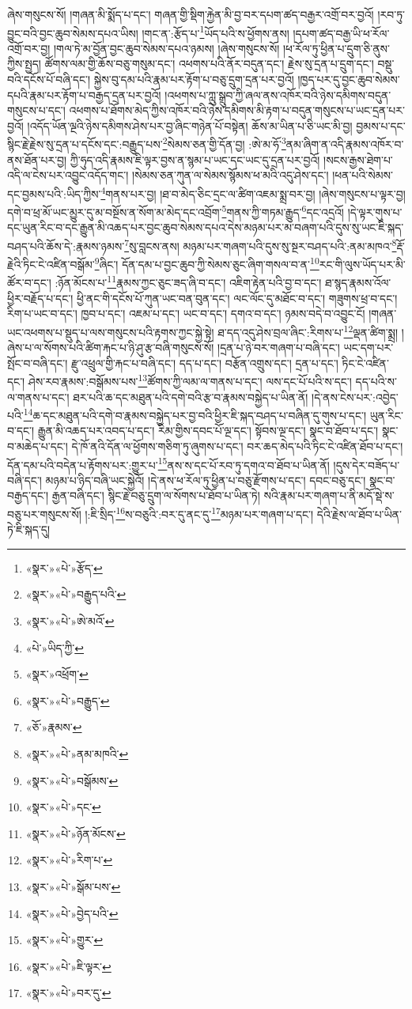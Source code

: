 ཞེས་གསུངས་སོ། །གཞན་མི་སྨོད་པ་དང་། གཞན་གྱི་སྡིག་རྐྱེན་མི་བྱ་བར་དཔག་ཚད་བརྒྱར་འགྲོ་བར་བྱའོ། །རབ་ཏུ་བྱུང་བའི་བྱང་ཆུབ་སེམས་དཔའ་ཡིས། །གང་ན་:རྩོད་པ་\footnote{«སྣར་»«པེ་»རྩོད་}ཡོད་པའི་ས་ཕྱོགས་ནས། །དཔག་ཚད་བརྒྱ་ཡི་ཕ་རོལ་འགྲོ་བར་བྱ། །གལ་ཏེ་མ་བྱོན་བྱང་ཆུབ་སེམས་དཔའ་ཉམས། །ཞེས་གསུངས་སོ། །ཕ་རོལ་ཏུ་ཕྱིན་པ་དྲུག་ཅི་ནུས་ཀྱིས་སྤྱད། ཚོགས་ལམ་གྱི་ཆོས་བཅུ་གསུམ་དང་། འཕགས་པའི་ནོར་བདུན་དང་། རྗེས་སུ་དྲན་པ་དྲུག་དང་། བསྡུ་བའི་དངོས་པོ་བཞི་དང་། སྐྱེས་བུ་དམ་པའི་རྣམ་པར་རྟོག་པ་བཅུ་དྲུག་དྲན་པར་བྱའོ། །ཁྱད་པར་དུ་བྱང་ཆུབ་སེམས་དཔའི་རྣམ་པར་རྟོག་པ་བརྒྱད་དྲན་པར་བྱའོ། །འཕགས་པ་ཀླུ་སྒྲུབ་ཀྱི་ཞལ་ནས་འཁོར་བའི་ཉེས་དམིགས་བདུན་གསུངས་པ་དང་། འཕགས་པ་ཐོགས་མེད་ཀྱིས་འཁོར་བའི་ཉེས་དམིགས་མི་རྟག་པ་བདུན་གསུངས་པ་ཡང་དྲན་པར་བྱའོ། །འདོད་ཡོན་ལྔའི་ཉེས་དམིགས་ཤེས་པར་བྱ་ཞིང་གཉེན་པོ་བསྟེན། ཆོས་མ་ཡིན་པ་ཅི་ཡང་མི་བྱ། བྱམས་པ་དང་སྙིང་རྗེ་རྗེས་སུ་དྲན་པ་དངོས་དང་:བརྒྱུད་པས་\footnote{«སྣར་»«པེ་»བརྒྱུད་པའི་}སེམས་ཅན་གྱི་དོན་བྱ། :ཨེ་མ་ཧོ་\footnote{«སྣར་»«པེ་»ཨེ་མའོ་}ནམ་ཞིག་ན་འདི་རྣམས་འཁོར་བ་ནས་ཐོན་པར་བྱ། ཀྱི་ཧུད་འདི་རྣམས་ཇི་ལྟར་བྱས་ན་སྙམ་པ་ཡང་དང་ཡང་དུ་དྲན་པར་བྱའོ། །སངས་རྒྱས་ཐེག་པ་འདི་ལ་ངེས་པར་འབྱུང་འདོད་གང་། །སེམས་ཅན་ཀུན་ལ་སེམས་སྙོམས་ཕ་མའི་འདུ་ཤེས་དང་། །ཕན་པའི་སེམས་དང་བྱམས་པའི་:ཡིད་ཀྱིས་\footnote{«པེ་»ཡིད་ཀྱི་}གནས་པར་བྱ། །ཐ་བ་མེད་ཅིང་དྲང་ལ་ཚིག་འཇམ་སྨྲ་བར་བྱ། །ཞེས་གསུངས་པ་ལྟར་བྱ། དགེ་བ་ཕྲ་མོ་ཡང་མྱུར་དུ་མ་བསྔོས་ན་སོག་མ་མེད་དང་འབྲོག་\footnote{«སྣར་»འཕྲོག་}གནས་ཀྱི་གཏམ་རྒྱུད་\footnote{«སྣར་»«པེ་»བརྒྱུད་}དང་འདྲའོ། །དེ་ལྟར་གུས་པ་དང་ཡུན་རིང་བ་དང་རྒྱུན་མི་འཆད་པར་བྱང་ཆུབ་སེམས་དཔའ་དེས་མཉམ་པར་མ་བཞག་པའི་དུས་སུ་ཡང་ཇི་སྐད་བཤད་པའི་ཆོས་དེ་:རྣམས་ཉམས་\footnote{«ཅོ་»རྣམས་}སུ་བླངས་ནས། མཉམ་པར་གཞག་པའི་དུས་སུ་སྔར་བཤད་པའི་:ནམ་མཁའ་\footnote{«སྣར་»«པེ་»ནམ་མཁའི་}རྡོ་རྗེའི་ཏིང་ངེ་འཛིན་བསྒོམ་\footnote{«སྣར་»«པེ་»བསྒོམས་}ཞིང་། དོན་དམ་པ་བྱང་ཆུབ་ཀྱི་སེམས་ཅུང་ཞིག་གསལ་བ་ན་\footnote{«སྣར་»«པེ་»དང་}རང་གི་ལུས་ཡོད་པར་མི་ཚོར་བ་དང་། :ཉོན་མོངས་པ་\footnote{«སྣར་»«པེ་»ཉོན་མོངས་}རྣམས་ཀྱང་ཅུང་ཟད་ཞི་བ་དང་། འཇིག་རྟེན་པའི་བྱ་བ་དང་། ཐ་སྙད་རྣམས་འོལ་ཕྱིར་བརྗོད་པ་དང་། ཕྱི་ནང་གི་དངོས་པོ་ཀུན་ཡང་བན་བུན་དང་། ལང་ལོང་དུ་མཐོང་བ་དང་། གཟུགས་ཕྲ་བ་དང་། རིག་པ་ཡང་བ་དང་། ཁྱབ་པ་དང་། འཇམ་པ་དང་། ཡང་བ་དང་། དགའ་བ་དང་། ཉམས་བདེ་བ་འབྱུང་ངོ། །གཞན་ཡང་འཕགས་པ་སྡུད་པ་ལས་གསུངས་པའི་རྟགས་ཀྱང་སྐྱེ་སྟེ། ཐ་དད་འདུ་ཤེས་བྲལ་ཞིང་:རིགས་པ་\footnote{«སྣར་»«པེ་»རིག་པ་}ལྡན་ཚིག་སྨྲ། །ཞེས་པ་ལ་སོགས་པའི་ཚིག་རྐང་པ་ཉི་ཤུ་རྩ་བཞི་གསུངས་སོ། །དྲན་པ་ཉེ་བར་གཞག་པ་བཞི་དང་། ཡང་དག་པར་སྤོང་བ་བཞི་དང་། རྫུ་འཕྲུལ་གྱི་རྐང་པ་བཞི་དང་། དད་པ་དང་། བརྩོན་འགྲུས་དང་། དྲན་པ་དང་། ཏིང་ངེ་འཛིན་དང་། ཤེས་རབ་རྣམས་:བསྒོམས་པས་\footnote{«སྣར་»«པེ་»སྒོམ་པས་}ཚོགས་ཀྱི་ལམ་ལ་གནས་པ་དང་། ལས་དང་པོ་པའི་ས་དང་། དད་པའི་ས་ལ་གནས་པ་དང་། ཐར་པའི་ཆ་དང་མཐུན་པའི་དགེ་བའི་རྩ་བ་རྣམས་བསྐྱེད་པ་ཡིན་ནོ། །དེ་ནས་ངེས་པར་:འབྱེད་པའི་\footnote{«སྣར་»«པེ་»བྱེད་པའི་}ཆ་དང་མཐུན་པའི་དགེ་བ་རྣམས་བསྐྱེད་པར་བྱ་བའི་ཕྱིར་ཇི་སྐད་བཤད་པ་བཞིན་དུ་གུས་པ་དང་། ཡུན་རིང་བ་དང་། རྒྱུན་མི་འཆད་པར་འབད་པ་དང་། རིམ་གྱིས་དབང་པོ་ལྔ་དང་། སྟོབས་ལྔ་དང་། སྣང་བ་ཐོབ་པ་དང་། སྣང་བ་མཆེད་པ་དང་། དེ་ཁོ་ནའི་དོན་ལ་ཕྱོགས་གཅིག་ཏུ་ཞུགས་པ་དང་། བར་ཆད་མེད་པའི་ཏིང་ངེ་འཛིན་ཐོབ་པ་དང་། དོན་དམ་པའི་བདེན་པ་རྟོགས་པར་:གྱུར་པ་\footnote{«སྣར་»«པེ་»གྱུར་}ནས་ས་དང་པོ་རབ་ཏུ་དགའ་བ་ཐོབ་པ་ཡིན་ནོ། །དུས་དེར་བཟོད་པ་བཞི་དང་། མཉམ་པ་ཉིད་བཞི་ཡང་སྐྱེའོ། །དེ་ནས་ཕ་རོལ་ཏུ་ཕྱིན་པ་བཅུ་རྫོགས་པ་དང་། དབང་བཅུ་དང་། སྣང་བ་བརྒྱད་དང་། རྒྱན་བཞི་དང་། སྙིང་རྗེ་བཅུ་དྲུག་ལ་སོགས་པ་ཐོབ་པ་ཡིན་ཏེ། སའི་རྣམ་པར་གཞག་པ་ནི་མདོ་སྡེ་ས་བཅུ་པར་གསུངས་སོ། །:ཇི་སྲིད་\footnote{«སྣར་»«པེ་»ཇི་ལྟར་}ས་བཅུའི་:བར་དུ་ནང་དུ་\footnote{«སྣར་»«པེ་»བར་དུ་}མཉམ་པར་གཞག་པ་དང་། དེའི་རྗེས་ལ་ཐོབ་པ་ཡིན་ཏེ་ཇི་སྐད་དུ། 